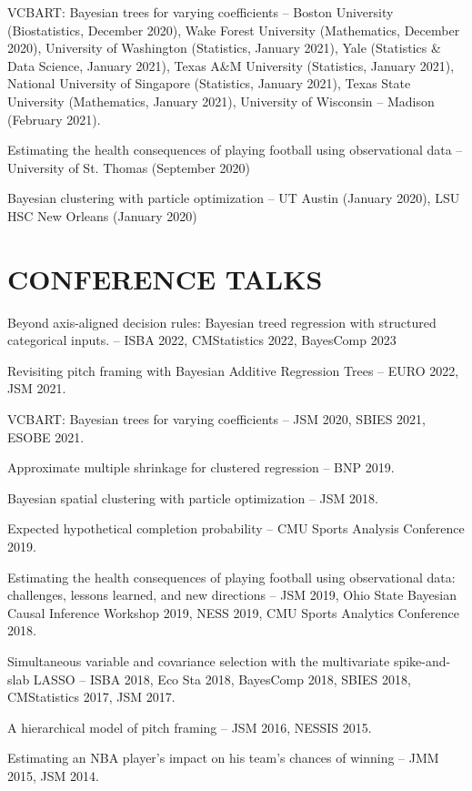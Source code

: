 \documentclass[margin]{res}
\begin{document}
\begin{resume}
VCBART: Bayesian trees for varying coefficients -- Boston University (Biostatistics, December 2020), Wake Forest University (Mathematics, December 2020), University of Washington (Statistics, January 2021), 
Yale (Statistics \& Data Science, January 2021), Texas A\&M University (Statistics, January 2021), National University of Singapore (Statistics, January 2021), Texas State University (Mathematics, January 2021), University of Wisconsin -- Madison (February 2021). 

Estimating the health consequences of playing football using observational data -- University of St. Thomas (September 2020)

Bayesian clustering with particle optimization -- UT Austin (January 2020), LSU HSC New Orleans (January 2020)

\section{CONFERENCE \hspace{0.1in} TALKS}

Beyond axis-aligned decision rules: Bayesian treed regression with structured categorical inputs. -- ISBA 2022, CMStatistics 2022, BayesComp 2023

Revisiting pitch framing with Bayesian Additive Regression Trees -- EURO 2022, JSM 2021.

VCBART: Bayesian trees for varying coefficients -- JSM 2020, SBIES 2021, ESOBE 2021.

Approximate multiple shrinkage for clustered regression -- BNP 2019.

Bayesian spatial clustering with particle optimization -- JSM 2018. 

Expected hypothetical completion probability -- CMU Sports Analysis Conference 2019.

Estimating the health consequences of playing football using observational data: challenges, lessons learned, and new directions -- JSM 2019, Ohio State Bayesian Causal Inference Workshop 2019, NESS 2019, CMU Sports Analytics Conference 2018.

Simultaneous variable and covariance selection with the multivariate spike-and-slab LASSO -- ISBA 2018, Eco Sta 2018, BayesComp 2018, SBIES 2018, CMStatistics 2017, JSM 2017.

A hierarchical model of pitch framing -- JSM 2016, NESSIS 2015.

Estimating an NBA player's impact on his team's chances of winning -- JMM 2015, JSM 2014.


\end{resume}
\end{document}
